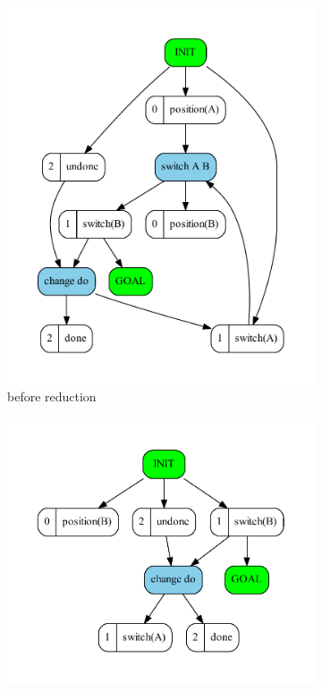 	\begin{figure}
		\begin{subfigure}[b]{0.4\textwidth}
			\includegraphics[scale=0.4]{actionStartMerge/figures/simple_input}
			\caption{before reduction}
		\end{subfigure}	
		\begin{subfigure}[b]{0.4\textwidth}
			\includegraphics[scale=0.4]{actionStartMerge/figures/simple_output}

\end{subfigure}
\end{figure}
